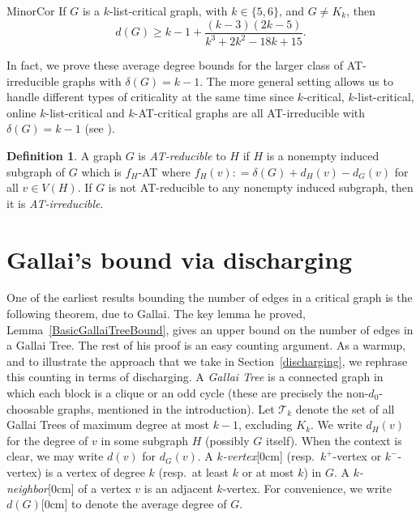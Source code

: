 \documentclass[12pt]{article}
\theoremstyle{plain}
\theoremstyle{definition}
\newtheorem{defn}{Definition}
\theoremstyle{remark}
\newcommand{\fancy}[1]{\mathcal{#1}}
\newcommand{\T}{\fancy{T}}
\newcommand{\DefinedAs}{\mathrel{\mathop:}=}
\newcommand{\aside}[1]{\marginnote{\scriptsize{#1}}[0cm]}
\begin{document}
\begin{repcor}{MinorCor}
If $G$ is a $k$-list-critical graph, with $k\in\{5,6\}$, and $G\ne K_k$, then
\[d(G) \ge k-1 + \frac{(k-3)(2k-5)}{k^3 + 2k^2 - 18k + 15}.\]
\end{repcor}

In fact, we prove these average degree bounds for the larger class of AT-irreducible graphs with $\delta(G) = k-1$.  
The more general setting allows us to handle different types of criticality at the same time since $k$-critical, $k$-list-critical, online $k$-list-critical and $k$-AT-critical graphs are all AT-irreducible 
with $\delta(G) = k-1$ (see \cite{OreVizing}).

\begin{defn}
	A graph $G$ is \emph{AT-reducible} to $H$ if $H$ is a nonempty induced subgraph of $G$ which is $f_H$-AT where $f_H(v) \DefinedAs \delta(G) + d_H(v) - d_G(v)$ for all $v \in V(H)$.  
	If $G$ is not AT-reducible to any nonempty induced subgraph, then it is \emph{AT-irreducible}.
\end{defn}

\section{Gallai's bound via discharging}
\label{sec:gallai}

One of the earliest results bounding the number of edges in a critical graph is
the following theorem, due to Gallai.  The key lemma he proved,
Lemma~\ref{BasicGallaiTreeBound}, gives an upper bound on the number of edges
in a Gallai Tree.  The rest of his proof is an easy
counting argument.  As a warmup, and to illustrate the approach that we take in
Section~\ref{discharging}, we rephrase this counting in terms of
discharging.  A \emph{Gallai Tree} is a connected graph in which each block is a
clique or an odd cycle (these are precisely the non-$d_0$-choosable graphs,
mentioned in the introduction).  Let $\T_k$ denote the set of all Gallai
Trees of maximum degree at most $k-1$, excluding $K_k$. 
We write $d_H(v)$ for the degree of $v$ in some subgraph $H$ (possibly $G$
itself).  When the context is clear, we may write $d(v)$ for $d_G(v)$.
A \emph{$k$-vertex}\aside{$k$-vertex} (resp.~$k^+$-vertex or $k^-$-vertex)
is a vertex of degree $k$ (resp.~at least $k$ or at most $k$) in $G$.  A
\emph{$k$-neighbor}\aside{$k$-neighbor} of a vertex $v$ is an adjacent $k$-vertex.
For convenience, we write $d(G)$\aside{$d(G)$} to denote the average degree of $G$.
\end{document}
